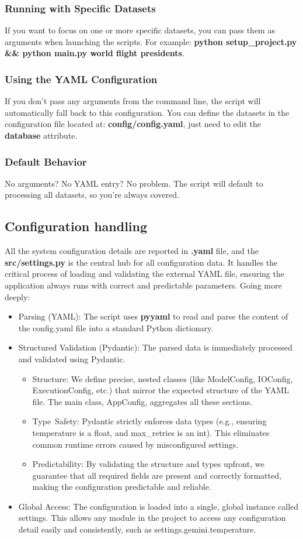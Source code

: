 \documentclass[12pt,a4paper]{article}
\begin{document}
\subsubsection{Running with Specific Datasets}
If you want to focus on one or more specific datasets, you can pass them as arguments when launching the scripts. For example: \textbf{python setup\_project.py \&\&  python main.py world flight presidents}.
\subsubsection{Using the YAML Configuration}
If you don’t pass any arguments from the command line, the script will automatically fall back to this configuration.
You can define the datasets in the configuration file located at: \textbf{config/config.yaml}, just need to edit the \textbf{database} attribute.
\subsubsection{Default Behavior}
No arguments? No YAML entry? No problem. The script will default to processing all datasets, so you’re always covered.

\subsection{Configuration handling}
All the system configuration details are reported  in \textbf{.yaml} file, and the \textbf{src/settings.py} is the central hub for all configuration data. It handles the critical process of loading and validating the external YAML file, ensuring the application always runs with correct and predictable parameters.
Going more deeply:
\begin{itemize}
  \item Parsing (YAML): The script uses \textbf{pyyaml} to read and parse the content of the config.yaml file into a standard Python dictionary.
  \item Structured Validation (Pydantic): The parsed data is immediately processed and validated using Pydantic.
    \begin{itemize}
      \item   Structure: We define precise, nested classes (like ModelConfig, IOConfig, ExecutionConfig, etc.) that mirror the expected structure of the YAML file. The main class, AppConfig, aggregates all these sections.
      \item Type\ Safety: Pydantic strictly enforces data types (e.g., ensuring temperature is a float, and max\_retries is an int). This eliminates common runtime errors caused by misconfigured settings.
      \item Predictability: By validating the structure and types upfront, we guarantee that all required fields are present and correctly formatted, making the configuration predictable and reliable.
    \end{itemize}  
  \item Global Access: The configuration is loaded into a single, global instance called settings. This allows any module in the project to access any configuration detail easily and consistently, such as settings.gemini.temperature.
\end{itemize}
\end{document}
